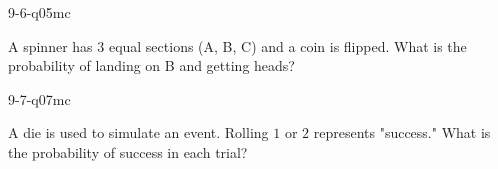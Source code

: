 \begin{practiceQuestion}{9-6-q05}{mc}
\begin{questionText}
A spinner has $3$ equal sections (A, B, C) and a coin is flipped. What is the probability of landing on B and getting heads?
\end{questionText}
\end{practiceQuestion}

\begin{practiceQuestion}{9-7-q07}{mc}
\begin{questionText}
A die is used to simulate an event. Rolling $1$ or $2$ represents "success." What is the probability of success in each trial?
\end{questionText}
\end{practiceQuestion}
